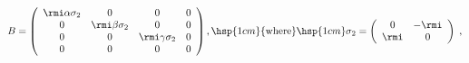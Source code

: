 \begin{equation}
B=\left( \begin{array}{cccc}
\rmi \alpha \sigma_2 & 0 & 0 & 0 \\
0 & \rmi \beta \sigma_2 & 0 & 0 \\
0 & 0 & \rmi \gamma \sigma_2& 0 \\
0 & 0 & 0 & 0 
\end{array}\right) , \hsp{1cm} {\rm where} \hsp{1cm}  
\sigma_2=\left( \begin{array}{cc}
0 & -\rmi \\
\rmi & 0
 \end{array}\right)\; ,
\label{B}
\end{equation}

